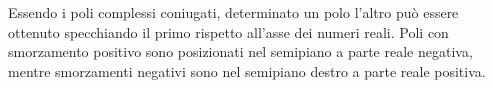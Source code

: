 		Essendo i poli complessi coniugati, determinato un polo l'altro può essere ottenuto specchiando il primo rispetto all'asse dei numeri reali. Poli con smorzamento positivo sono posizionati nel semipiano a parte reale negativa, mentre smorzamenti negativi sono nel semipiano destro a parte reale positiva.
		 
	
		
	
	
	
	
	
	
	
	
	
	
	
	
	
	
	
	
	
	
	
	
	
	
	
	
	
	
	
	
	
		
		
	